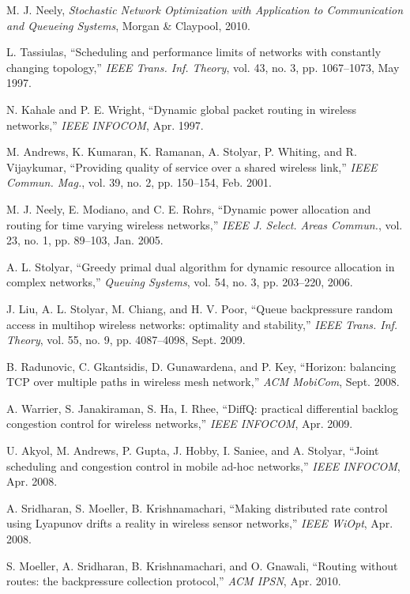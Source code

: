 \documentclass[conference]{IEEEtran}
\begin{document}
\begin{thebibliography}{}
 M. J. Neely, \emph{Stochastic Network Optimization with Application to Communication and Queueing Systems}, Morgan \& Claypool, 2010.

 L. Tassiulas, ``Scheduling and performance limits of networks with constantly changing topology,'' {\em IEEE Trans. Inf. Theory}, vol. 43, no. 3, pp. 1067--1073, May 1997.

 N. Kahale and P. E. Wright, ``Dynamic global packet routing in wireless networks,'' {\em IEEE INFOCOM}, Apr. 1997.

 M. Andrews, K. Kumaran, K. Ramanan, A. Stolyar, P. Whiting, and R. Vijaykumar, ``Providing quality of service over a shared wireless link,'' {\em IEEE Commun. Mag.}, vol. 39, no. 2, pp. 150--154, Feb. 2001.

 M. J. Neely, E. Modiano, and C. E. Rohrs, ``Dynamic power allocation and routing for time varying wireless networks,'' {\em IEEE J. Select. Areas Commun.}, vol. 23, no. 1, pp. 89--103, Jan. 2005.

 A. L. Stolyar, ``Greedy primal dual algorithm for dynamic resource allocation in complex networks,'' {\em Queuing Systems}, vol. 54, no. 3, pp. 203--220, 2006.

 J. Liu, A. L. Stolyar, M. Chiang, and H. V. Poor, ``Queue backpressure random access in multihop wireless networks: optimality and stability,'' {\em IEEE Trans. Inf. Theory}, vol. 55, no. 9, pp. 4087--4098, Sept. 2009.

 B. Radunovic, C. Gkantsidis, D. Gunawardena, and P. Key, ``Horizon: balancing TCP over multiple paths in wireless mesh network,'' {\em ACM MobiCom}, Sept. 2008.

 A. Warrier, S. Janakiraman, S. Ha, I. Rhee, ``DiffQ: practical differential backlog congestion control for wireless networks,'' {\em IEEE INFOCOM}, Apr. 2009.

 U. Akyol, M. Andrews, P. Gupta, J. Hobby, I. Saniee, and A. Stolyar, ``Joint scheduling and congestion control in mobile ad-hoc networks,'' {\em IEEE INFOCOM}, Apr. 2008.

 A. Sridharan, S. Moeller, B. Krishnamachari, ``Making distributed rate control using Lyapunov drifts a reality in wireless sensor networks,'' {\em IEEE WiOpt}, Apr. 2008.

 S. Moeller, A. Sridharan, B. Krishnamachari, and O. Gnawali, ``Routing without routes: the backpressure collection protocol,'' {\em ACM IPSN}, Apr. 2010.


\end{thebibliography}
\end{document}
